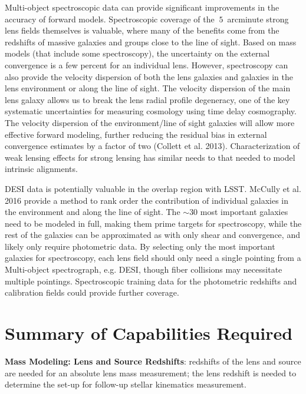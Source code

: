 Multi-object spectroscopic data can provide significant improvements in
the accuracy of forward models. Spectroscopic coverage of the
$~5$~arcminute strong lens fields themselves is valuable, where many of
the benefits come from the redshifts of massive galaxies and groups
close to the line of sight. Based on mass models (that include some
spectroscopy), the uncertainty on the external convergence is a few
percent for an individual lens. However, spectroscopy can also provide
the velocity dispersion of both the lens galaxies and galaxies in the
lens environment or along the line of sight. The velocity dispersion of
the main lens galaxy allows us to break the lens radial profile
degeneracy, one of the key systematic uncertainties for measuring
cosmology using time delay cosmography. The velocity dispersion of the
environment/line of sight galaxies will allow more effective forward
modeling, further reducing the residual bias in external convergence
estimates by a factor of two (Collett et al. 2013). Characterization of
weak lensing effects for strong lensing has similar needs to that needed
to model intrinsic alignments.

DESI data is potentially valuable in the overlap region with LSST.
McCully et al. 2016 provide a method to rank order the contribution of
individual galaxies in the environment and along the line of sight. The
$\sim 30$ most important galaxies need to be modeled in full, making
them prime targets for spectroscopy, while the rest of the galaxies can
be approximated as with only shear and convergence, and likely only
require photometric data. By selecting only the most important galaxies
for spectroscopy, each lens field should only need a single pointing
from a Multi-object spectrograph, e.g. DESI, though fiber collisions may
necessitate multiple pointings. Spectroscopic training data for the
photometric redshifts and calibration fields could provide further
coverage.


\section{Summary of Capabilities Required}
\label{sec:sl_summary}

{\bf Mass Modeling: Lens and Source Redshifts}: redshifts of the lens
and source are needed for an absolute lens mass measurement; the lens
redshift is needed to determine the set-up for follow-up stellar
kinematics measurement.

